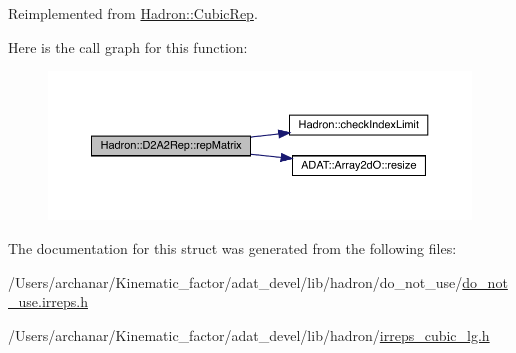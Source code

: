 Reimplemented from \mbox{\hyperlink{structHadron_1_1CubicRep_ac5d7e9e6f4ab1158b5fce3e4ad9e8005}{Hadron\+::\+Cubic\+Rep}}.

Here is the call graph for this function\+:
\nopagebreak
\begin{figure}[H]
\begin{center}
\leavevmode
\includegraphics[width=350pt]{d2/dfc/structHadron_1_1D2A2Rep_a75e7a00548888c39a9e3613c4b5178ef_cgraph}
\end{center}
\end{figure}


The documentation for this struct was generated from the following files\+:\begin{DoxyCompactItemize}
\item 
/\+Users/archanar/\+Kinematic\+\_\+factor/adat\+\_\+devel/lib/hadron/do\+\_\+not\+\_\+use/\mbox{\hyperlink{do__not__use_8irreps_8h}{do\+\_\+not\+\_\+use.\+irreps.\+h}}\item 
/\+Users/archanar/\+Kinematic\+\_\+factor/adat\+\_\+devel/lib/hadron/\mbox{\hyperlink{lib_2hadron_2irreps__cubic__lg_8h}{irreps\+\_\+cubic\+\_\+lg.\+h}}\end{DoxyCompactItemize}
